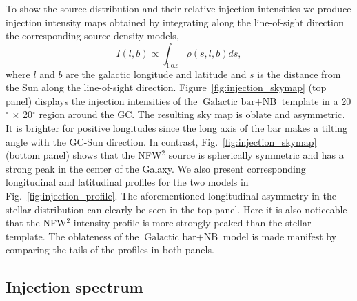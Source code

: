 \documentclass[doublespace,draft,nopageskip]{VTthesis} %
\begin{document}
To show the source distribution and their relative injection intensities we produce injection intensity maps obtained by integrating along the line-of-sight direction the corresponding source density models,
\begin{equation}
  \label{eq:j_factor}
  I(l,b) \propto \int_{\text{l.o.s}} \rho(s,l,b) ds,
\end{equation}
where $l$ and $b$ are the galactic longitude and latitude and $s$ is the distance from the Sun along the line-of-sight direction.
Figure~\ref{fig:injection_skymap} (top panel) displays the injection intensities of the $\mbox{Galactic bar}+\mbox{NB}$ template in a 20$^\circ$ $\times$ 20$^\circ$ region around the GC. The resulting sky map is oblate and asymmetric. It is brighter for positive longitudes since the long axis of the bar makes a tilting angle with the GC-Sun direction. In contrast, Fig.~\ref{fig:injection_skymap} (bottom panel) shows that the NFW$^2$ source is spherically symmetric and has a strong peak in the center of the Galaxy. We also present corresponding longitudinal and latitudinal profiles for the two models in Fig.~\ref{fig:injection_profile}. The aforementioned longitudinal asymmetry in the stellar distribution can clearly be seen in the top panel. Here it is also noticeable that the NFW$^2$ intensity profile is more strongly peaked than the stellar template. The oblateness of the $\mbox{Galactic bar}+\mbox{NB}$ model is made manifest by comparing the tails of the profiles in both panels.

\subsection{Injection spectrum}\label{sec:spectrum}
\end{document}
